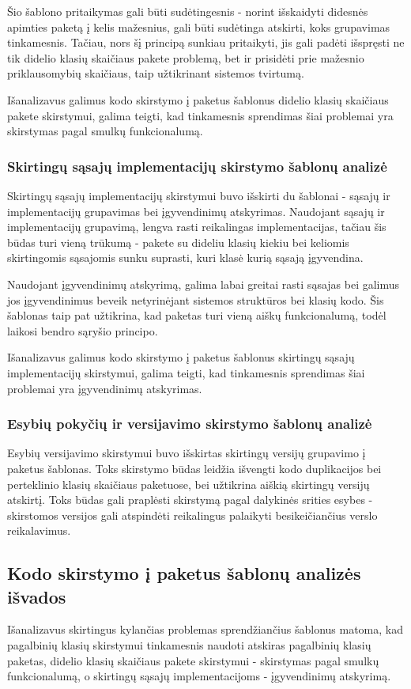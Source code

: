 Šio šablono pritaikymas gali būti sudėtingesnis - norint išskaidyti didesnės apimties paketą į kelis mažesnius, gali būti
sudėtinga atskirti, koks grupavimas tinkamesnis.
Tačiau, nors šį principą sunkiau pritaikyti, jis gali padėti išspręsti ne tik didelio klasių skaičiaus pakete problemą,
bet ir prisidėti prie mažesnio priklausomybių skaičiaus, taip užtikrinant sistemos tvirtumą.

Išanalizavus galimus kodo skirstymo į paketus šablonus didelio klasių skaičiaus pakete skirstymui, galima teigti, kad tinkamesnis sprendimas šiai
problemai yra skirstymas pagal smulkų funkcionalumą.


\subsubsection{Skirtingų sąsajų implementacijų skirstymo šablonų analizė}
Skirtingų sąsajų implementacijų skirstymui buvo išskirti du šablonai - sąsajų ir implementacijų grupavimas bei
įgyvendinimų atskyrimas.
Naudojant sąsajų ir implementacijų grupavimą, lengva rasti reikalingas implementacijas, tačiau šis būdas
turi vieną trūkumą - pakete su dideliu klasių kiekiu bei keliomis skirtingomis sąsajomis sunku suprasti, kuri klasė kurią sąsają įgyvendina.

Naudojant įgyvendinimų atskyrimą, galima labai greitai rasti sąsajas bei galimus jos įgyvendinimus beveik netyrinėjant sistemos struktūros bei klasių kodo.
Šis šablonas taip pat užtikrina, kad paketas turi vieną aiškų funkcionalumą, todėl laikosi bendro sąryšio principo.

Išanalizavus galimus kodo skirstymo į paketus šablonus skirtingų sąsajų implementacijų skirstymui, galima teigti, kad tinkamesnis sprendimas šiai
problemai yra įgyvendinimų atskyrimas.

\subsubsection{Esybių pokyčių ir versijavimo skirstymo šablonų analizė}
Esybių versijavimo skirstymui buvo išskirtas skirtingų versijų grupavimo į paketus šablonas.
Toks skirstymo būdas leidžia išvengti kodo duplikacijos bei perteklinio klasių skaičiaus paketuose, bei užtikrina aiškią skirtingų versijų
atskirtį. Toks būdas gali praplėsti skirstymą pagal dalykinės srities esybes - skirstomos versijos gali atspindėti reikalingus
palaikyti besikeičiančius verslo reikalavimus.

\subsection{Kodo skirstymo į paketus šablonų analizės išvados}
Išanalizavus skirtingus kylančias problemas sprendžiančius šablonus matoma, kad
pagalbinių klasių skirstymui tinkamesnis naudoti atskiras pagalbinių klasių paketas,
didelio klasių skaičiaus pakete skirstymui - skirstymas pagal smulkų funkcionalumą,
o skirtingų sąsajų implementacijoms - įgyvendinimų atskyrimą.

